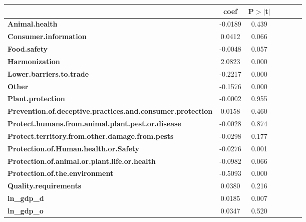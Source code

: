 \begin{table}[ht]
    \begin{center}
        \begin{tabular}{lcccccc}
            & \textbf{coef} & \textbf{P$> |$t$|$}\\
            \midrule
\textbf{Animal.health}                                             &      -0.0189  &         0.439   \\
\textbf{Consumer.information}                                      &       0.0412  &         0.066   \\
\textbf{Food.safety}                                               &      -0.0048  &         0.057   \\
\textbf{Harmonization}                                             &       2.0823  &         0.000   \\
\textbf{Lower.barriers.to.trade}                                   &      -0.2217  &         0.000   \\
\textbf{Other}                                                     &      -0.1576  &         0.000   \\
\textbf{Plant.protection}                                          &      -0.0002  &         0.955   \\
\textbf{Prevention.of.deceptive.practices.and.consumer.protection} &       0.0158  &         0.460   \\
\textbf{Protect.humans.from.animal.plant.pest.or.disease}          &      -0.0028  &         0.874   \\
\textbf{Protect.territory.from.other.damage.from.pests}            &      -0.0298  &         0.177   \\
\textbf{Protection.of.Human.health.or.Safety}                      &      -0.0276  &         0.001   \\
\textbf{Protection.of.animal.or.plant.life.or.health}              &      -0.0982  &         0.066   \\
\textbf{Protection.of.the.environment}                             &      -0.5093  &         0.000   \\
\textbf{Quality.requirements}                                      &       0.0380  &         0.216   \\
\textbf{ln\_gdp\_d}                                                &       0.0185  &         0.007   \\
\textbf{ln\_gdp\_o}                                                &       0.0347  &         0.520   \\

\end{tabular}
\end{center}
\end{table}

